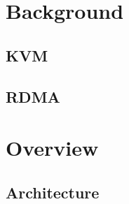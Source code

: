 \section{Background} \label{sec:background}

\subsection{KVM} \label{sec:kvm}

\subsection{\paxos}\label{sec:paxos}

\subsection{RDMA} \label{sec:rdma}

\section{\xxx Overview} \label{sec:overview}

\subsection{Architecture} \label{sec:arch}
